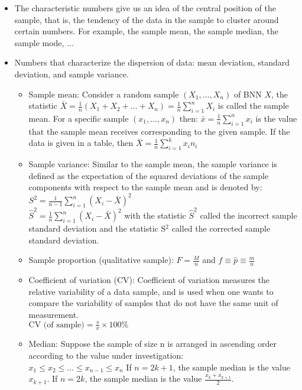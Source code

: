 \documentclass{article}
\begin{document}
\begin{itemize}
		\begin{itemize}
			\item The characteristic numbers give us an idea of the central position of the sample, that is, the tendency of the data in the sample to cluster around certain numbers. For example, the sample mean, the sample median, the sample mode, ...
			\item Numbers that characterize the dispersion of data: mean deviation, standard deviation, and sample variance.
			\begin{itemize}
				\item Sample mean: Consider a random sample \( (X_1, \ldots, X_n) \) of BNN \( X \), the statistic \( \bar{X} = \frac{1}{n} (X_1 + X_2 + \ldots + X_n) = \frac{1}{n} \sum_{i=1}^{n} X_i \) is called the sample mean. For a specific sample \( (x_1, \ldots, x_n) \) then: \(\bar{x} = \frac{1}{n} \sum_{i=1}^{n} x_i\) is the value that the sample mean receives corresponding to the given sample. If the data is given in a table, then \(\bar{X} = \frac{1}{n} \sum_{i=1}^{k} x_i n_i\)
				
				\item Sample variance: Similar to the sample mean, the sample variance is defined as the expectation of the squared deviations of the sample components with respect to the sample mean and is denoted by:
				\\
				\( S^2 = \frac{1}{n-1} \sum_{i=1}^{n} (X_i - \bar{X})^2\)
				\\
				\(\hat{S} ^2 = \frac{1}{n} \sum_{i=1}^{n} (X_i - \bar{X})^2\)
				with the statistic \( \hat{S} ^2 \) called the incorrect sample standard deviation and the statistic S$^2$ called the corrected sample standard deviation.
				
				\item Sample proportion (qualitative sample):
				\(F = \frac{M}{n}\) and \( f \equiv \hat{p} \equiv \frac{m}{n} \)
				
				\item Coefficient of variation (CV): Coefficient of variation measures the relative variability of a data sample, and is used when one wants to compare the variability of samples that do not have the same unit of measurement.
				\\
				\( \text{CV (of sample)} = \frac{s}{x} \times 100\% \)
				
				\item Median: Suppose the sample of size n is arranged in ascending order according to the value under investigation: 
				\\
				\( x_1 \le x_2 \le \ldots \le x_{n-1} \le x_n \)
				If \( n = 2k + 1 \), the sample median is the value \( x_{k+1} \). If \( n = 2k \), the sample median is the value \(\frac{x_k + x_{k+1}}{2} \).
				

\end{itemize}
\end{itemize}
\end{itemize}
\end{document}

